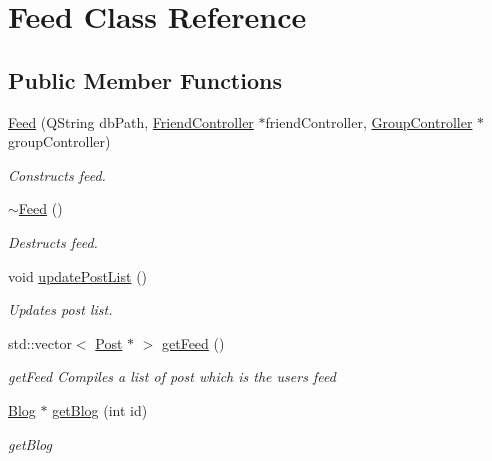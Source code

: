 \hypertarget{classFeed}{}\section{Feed Class Reference}
\label{classFeed}
\subsection*{Public Member Functions}
\begin{DoxyCompactItemize}
\item 
\hyperlink{classFeed_a39046cd22d8656c9a607a0a04ef2bd18}{Feed} (Q\+String db\+Path, \hyperlink{classFriendController}{Friend\+Controller} $\ast$friend\+Controller, \hyperlink{classGroupController}{Group\+Controller} $\ast$group\+Controller)
\begin{DoxyCompactList}\small\item\em Constructs feed. \end{DoxyCompactList}\item 
\hyperlink{classFeed_ad57cc00ddfdebda2466c31c5ecb39b9f}{$\sim$\+Feed} ()\hypertarget{classFeed_ad57cc00ddfdebda2466c31c5ecb39b9f}{}\label{classFeed_ad57cc00ddfdebda2466c31c5ecb39b9f}

\begin{DoxyCompactList}\small\item\em Destructs feed. \end{DoxyCompactList}\item 
void \hyperlink{classFeed_a266e70137762c06ec22c96d03caa8b27}{update\+Post\+List} ()\hypertarget{classFeed_a266e70137762c06ec22c96d03caa8b27}{}\label{classFeed_a266e70137762c06ec22c96d03caa8b27}

\begin{DoxyCompactList}\small\item\em Updates post list. \end{DoxyCompactList}\item 
std\+::vector$<$ \hyperlink{classPost}{Post} $\ast$ $>$ \hyperlink{classFeed_acb845b46829d0e7903a6e3dda4654725}{get\+Feed} ()
\begin{DoxyCompactList}\small\item\em get\+Feed Compiles a list of post which is the user\textquotesingle{}s feed \end{DoxyCompactList}\item 
\hyperlink{classBlog}{Blog} $\ast$ \hyperlink{classFeed_ab43f771f8c60d2c9478fedcd9ea309ac}{get\+Blog} (int id)
\begin{DoxyCompactList}\small\item\em get\+Blog \end{DoxyCompactList}\end{DoxyCompactItemize}


